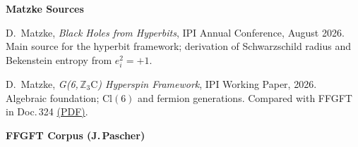 
\noindent\textbf{Matzke Sources}

\begin{description}[leftmargin=3.5em,style=sameline,itemsep=0.4em]

\item[{[M1]}] D.~Matzke, \textit{Black Holes from Hyperbits},
  IPI Annual Conference, August 2026. \\
  Main source for the hyperbit framework; derivation of Schwarzschild radius
  and Bekenstein entropy from $e_i^2 = +1$.

\item[{[M2]}] D.~Matzke, \textit{G(6,\,$\mathbb{Z}_3\text{C}$) Hyperspin
  Framework}, IPI Working Paper, 2026. \\
  Algebraic foundation; $\mathrm{Cl}(6)$ and fermion generations.
  Compared with FFGFT in Doc.\,324
  \href{https://github.com/jpascher/T0-Time-Mass-Duality/blob/main/2/pdf/324_G6_Z3C_FFGFT_Vergleich_De.pdf}{(PDF)}.

\end{description}

\bigskip
\noindent\textbf{FFGFT Corpus (J.\,Pascher)}

